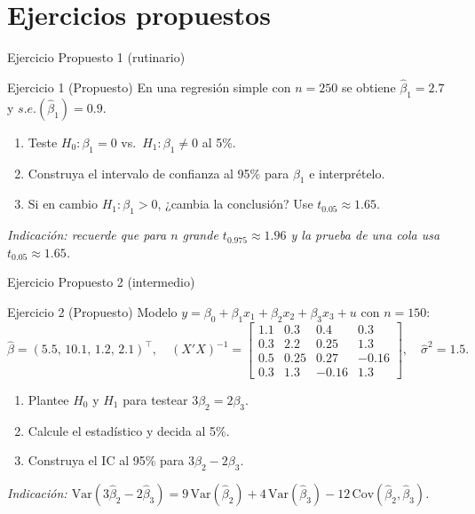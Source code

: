 \documentclass{beamer}
\begin{document}
\section{Ejercicios propuestos}

\begin{frame}{Ejercicio Propuesto 1 (rutinario)}

\begin{block}{Ejercicio 1 (Propuesto)}
En una regresión simple con $n=250$ se obtiene $\hat{\beta}_1 = 2.7$ y $s.e.(\hat{\beta}_1)=0.9$.
\begin{enumerate}
    \item Teste $H_0:\beta_1=0$ vs.\ $H_1:\beta_1\neq 0$ al 5\%.
    \item Construya el intervalo de confianza al 95\% para $\beta_1$ e interprételo.
    \item Si en cambio $H_1:\beta_1>0$, ¿cambia la conclusión? Use $t_{0.05}\approx 1.65$.
\end{enumerate}
\end{block}

{\small \textit{Indicación: recuerde que para $n$ grande $t_{0.975}\approx 1.96$ y la prueba de una cola usa $t_{0.05}\approx 1.65$.}}

\end{frame}

\begin{frame}{Ejercicio Propuesto 2 (intermedio)}

\begin{block}{Ejercicio 2 (Propuesto)}
Modelo $y = \beta_0 + \beta_1 x_1 + \beta_2 x_2 + \beta_3 x_3 + u$ con $n=150$:
\[
\hat{\beta} = (5.5,\,10.1,\,1.2,\,2.1)^{\top},\quad
(X'X)^{-1}=\begin{bmatrix} 1.1&0.3&0.4&0.3\\ 0.3&2.2&0.25&1.3\\ 0.5&0.25&0.27&-0.16\\ 0.3&1.3&-0.16&1.3\end{bmatrix},\quad \hat{\sigma}^2=1.5.
\]
\begin{enumerate}
    \item Plantee $H_0$ y $H_1$ para testear $3\beta_2 = 2\beta_3$.
    \item Calcule el estadístico y decida al 5\%.
    \item Construya el IC al 95\% para $3\beta_2 - 2\beta_3$.
\end{enumerate}
\end{block}

{\small \textit{Indicación: $\text{Var}(3\hat{\beta}_2 - 2\hat{\beta}_3) = 9\,\text{Var}(\hat{\beta}_2) + 4\,\text{Var}(\hat{\beta}_3) - 12\,\text{Cov}(\hat{\beta}_2,\hat{\beta}_3)$.}}

\end{frame}
\end{document}
